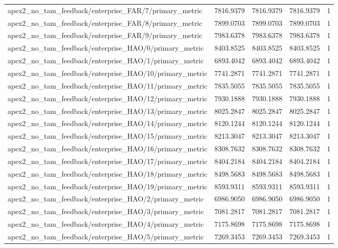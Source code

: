 \begin{table}[h]
\begin{tabular}{lrrrr}
apex2_no_tam_feedback/enterprise_FAR/7/primary_metric & 7816.9379 & 7816.9379 & 7816.9379 & 1 \\
apex2_no_tam_feedback/enterprise_FAR/8/primary_metric & 7899.0703 & 7899.0703 & 7899.0703 & 1 \\
apex2_no_tam_feedback/enterprise_FAR/9/primary_metric & 7983.6378 & 7983.6378 & 7983.6378 & 1 \\
apex2_no_tam_feedback/enterprise_HAO/0/primary_metric & 8403.8525 & 8403.8525 & 8403.8525 & 1 \\
apex2_no_tam_feedback/enterprise_HAO/1/primary_metric & 6893.4042 & 6893.4042 & 6893.4042 & 1 \\
apex2_no_tam_feedback/enterprise_HAO/10/primary_metric & 7741.2871 & 7741.2871 & 7741.2871 & 1 \\
apex2_no_tam_feedback/enterprise_HAO/11/primary_metric & 7835.5055 & 7835.5055 & 7835.5055 & 1 \\
apex2_no_tam_feedback/enterprise_HAO/12/primary_metric & 7930.1888 & 7930.1888 & 7930.1888 & 1 \\
apex2_no_tam_feedback/enterprise_HAO/13/primary_metric & 8025.2847 & 8025.2847 & 8025.2847 & 1 \\
apex2_no_tam_feedback/enterprise_HAO/14/primary_metric & 8120.1244 & 8120.1244 & 8120.1244 & 1 \\
apex2_no_tam_feedback/enterprise_HAO/15/primary_metric & 8213.3047 & 8213.3047 & 8213.3047 & 1 \\
apex2_no_tam_feedback/enterprise_HAO/16/primary_metric & 8308.7632 & 8308.7632 & 8308.7632 & 1 \\
apex2_no_tam_feedback/enterprise_HAO/17/primary_metric & 8404.2184 & 8404.2184 & 8404.2184 & 1 \\
apex2_no_tam_feedback/enterprise_HAO/18/primary_metric & 8498.5683 & 8498.5683 & 8498.5683 & 1 \\
apex2_no_tam_feedback/enterprise_HAO/19/primary_metric & 8593.9311 & 8593.9311 & 8593.9311 & 1 \\
apex2_no_tam_feedback/enterprise_HAO/2/primary_metric & 6986.9050 & 6986.9050 & 6986.9050 & 1 \\
apex2_no_tam_feedback/enterprise_HAO/3/primary_metric & 7081.2817 & 7081.2817 & 7081.2817 & 1 \\
apex2_no_tam_feedback/enterprise_HAO/4/primary_metric & 7175.8698 & 7175.8698 & 7175.8698 & 1 \\
apex2_no_tam_feedback/enterprise_HAO/5/primary_metric & 7269.3453 & 7269.3453 & 7269.3453 & 1 \\

\end{tabular}
\end{table}
